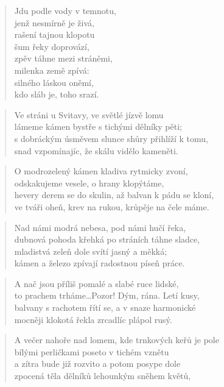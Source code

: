 \documentclass{book}
\begin{document}
\begin{verse}
Jdu podle vody v temnotu,\\
jenž nesmírně je živá,\\
rašení tajnou klopotu\\
šum řeky doprovází,\\
zpěv táhne mezi stráněmi,\\
milenka země zpívá:\\
silného láskou oněmí,\\
kdo sláb je, toho srazí.
\end{verse}
\newpage
{}
\begin{verse}
Ve stráni u Svitavy, ve světlé jízvě lomu\\
lámeme kámen bystře s tichými dělníky pěti;\\
s dobráckým úsměvem slunce shůry přihlíží k tomu,\\
snad vzpomínajíc, že skálu vidělo kameněti.
\end{verse}
\begin{verse}
O modrozelený kámen kladiva rytmicky zvoní,\\
odskakujeme vesele, o hrany klopýtáme,\\
hevery derem se do skulin, až balvan k pádu se kloní,\\
ve tváři oheň, krev na rukou, krůpěje na čele máme.
\end{verse}
\begin{verse}
Nad námi modrá nebesa, pod námi hučí řeka,\\
dubnová pohoda křehká po stráních táhne sladce,\\
mladistvá zeleň dole svítí jasný a měkká;\\
kámen a železo zpívají radostnou píseň práce.
\end{verse}
\begin{verse}
A nač jsou příliš pomalé a slabé ruce lidské,\\
to prachem trháme\ldots Pozor! Dým, rána. Letí kusy,\\
balvany s rachotem řítí se, a v snaze harmonické\\
mocněji klokotá řekla zrcadlíc plápol rusý.
\end{verse}
\begin{verse}
A večer nahoře nad lomem, kde trnkových keřů je pole\\
bílými perličkami poseto v tichém vznětu\\
a zítra bude již rozvito a potom posype dole\\
zpocená těla dělníků lehounkým sněhem květů,\\
\end{verse}
\end{document}
